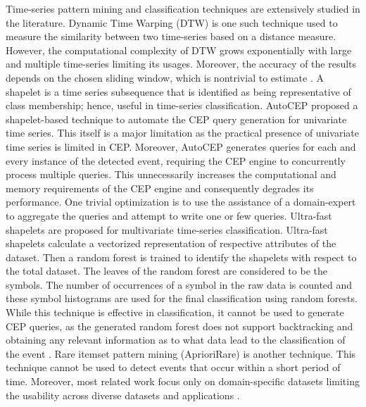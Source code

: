 \documentclass[conference]{IEEEtran}  %
\begin{document}
Time-series pattern mining and classification techniques are extensively studied in the literature. Dynamic Time Warping (DTW) \cite{IEEEexample:DTW} is one such technique used to measure the similarity between two time-series based on a distance measure. However, the computational complexity of DTW grows exponentially with large and multiple time-series limiting its usages. Moreover, the accuracy of the results depends on the chosen sliding window, which is nontrivial to estimate \cite{IEEEexample:autoCEP}. A shapelet \cite{IEEEexample:TimeSeriesShapelets} is a time series subsequence that is identified as being representative of class membership; hence, useful in time-series classification. AutoCEP \cite{IEEEexample:autoCEP} proposed a shapelet-based technique to automate the CEP query generation for univariate time series. This itself is a major limitation as the practical presence of univariate time series is limited in CEP. Moreover, AutoCEP generates queries for each and every instance of the detected event, requiring the CEP engine to concurrently process multiple queries. This unnecessarily increases the computational and memory requirements of the CEP engine and consequently degrades its performance. One trivial optimization is to use the assistance of a domain-expert to aggregate the queries and attempt to write one or few queries. Ultra-fast shapelets \cite{IEEEexample:UltraFast} are proposed for multivariate time-series classification. Ultra-fast shapelets calculate a vectorized representation of respective attributes of the dataset. Then a random forest is trained to identify the shapelets with respect to the total dataset. The leaves of the random forest are considered to be the symbols. The number of occurrences of a symbol in the raw data is counted and these symbol histograms are used for the final classification using random forests. While this technique is effective in classification, it cannot be used to generate CEP queries, as the generated random forest does not support backtracking and obtaining any relevant information as to what data lead to the classification of the event \cite{IEEEexample:UltraFast}. Rare itemset pattern mining (AprioriRare) \cite{IEEEexample:RareItemSet} is another technique. This technique cannot be used to detect events that occur within a short period of time. Moreover, most related work focus only on domain-specific datasets limiting the usability across diverse datasets and applications \cite{IEEEexample:UserOriented,IEEEexample:WebBased}.
\end{document}
